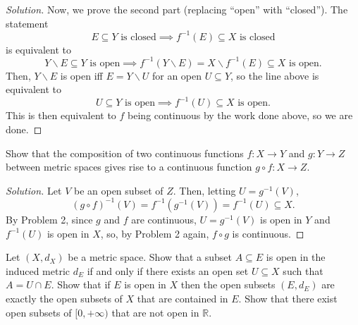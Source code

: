 \documentclass[11pt]{scrartcl}
\providecommand{\RR}{\mathbb R}
\providecommand{\setdiff}{\smallsetminus}
\providecommand{\inv}{^{-1}}
\newenvironment{soln}{\begin{proof}[Solution]}{\end{proof}}
\begin{document}
\begin{soln}
	Now, we prove the second part (replacing ``open'' with ``closed'').
	The statement
	\[E\subseteq Y\text{ is closed}\implies
	f\inv(E)\subseteq X\text{ is closed}\]
	is equivalent to
	\[Y\setdiff E\subseteq Y\text{ is open} \implies
	f\inv(Y\setdiff E) = X\setdiff f\inv(E)\subseteq X\text { is open}.\]
	Then, $Y\setdiff E$ is open iff
	$E = Y\setdiff U$ for an open $U\subseteq Y$,
	so the line above is equivalent to
	\[U\subseteq Y\text{ is open}\implies f\inv(U)\subseteq X\text{ is open}.\]
	This is then equivalent to $f$ being continuous
	by the work done above, so we are done.
\end{soln}

\begin{problem}
	Show that the composition of two continuous functions
	$f\colon X\to Y$ and $g\colon Y\to Z$ between metric spaces
	gives rise to a continuous function $g\circ f\colon X\to Z$.
\end{problem}

\begin{soln}
	Let $V$ be an open subset of $Z$. Then, letting $U = g\inv(V)$,
	\[(g\circ f)\inv(V) = f\inv(g\inv(V)) = f\inv(U)\subseteq X.\]
	By Problem 2, since $g$ and $f$ are continuous,
	$U = g\inv(V)$ is open in $Y$ and $f\inv(U)$ is open in $X$,
	so, by Problem 2 again, $f\circ g$ is continuous.
\end{soln}

\begin{problem}
	Let $(X, d_X)$ be a metric space.
	Show that a subset $A\subseteq E$ is open in the induced metric
	$d_E$ if and only if there exists an open set $U\subseteq X$
	such that $A = U\cap E$.
	Show that if $E$ is open in $X$ then the open subsets
	$(E, d_E)$ are exactly the open subsets of $X$ that are contained in $E$.
	Show that there exist open subsets of $[0, +\infty)$
	that are not open in $\RR$.
\end{problem}
\end{document}

